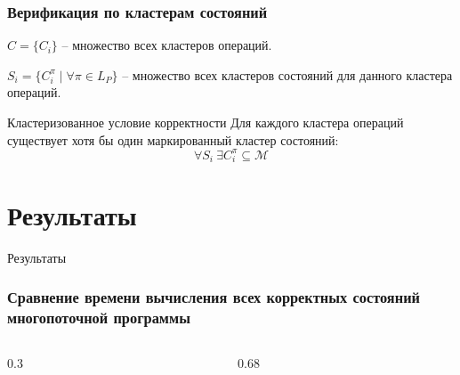 \begin{frame}
  \frametitle{Верификация по кластерам состояний}

  $C = \{C_i\}$ -- множество всех кластеров операций.

  $S_i = \{C_i^{\pi} \mid \forall \pi \in L_P\}$ -- множество всех
  кластеров состояний для данного кластера операций.

  \begin{block}{Кластеризованное условие корректности}
    Для каждого кластера операций существует
    хотя бы один маркированный кластер состояний:
    \[
      \forall S_i\ \exists
      C_i^\pi \subseteq \mathcal{M}
    \]
  \end{block}


\end{frame}

\section{Результаты}
\begin{frame}[plain]
  \begin{center}
    \Huge
    Результаты
  \end{center}
\end{frame}

\begin{frame}
  \frametitle{Сравнение времени вычисления всех корректных состояний
  многопоточной программы}

  \begin{columns}[T, onlytextwidth]
    \begin{column}{0.3\textwidth}
      
    \end{column}

    \begin{column}{0.68\textwidth}
      
    \end{column}
  \end{columns}
\end{frame}

